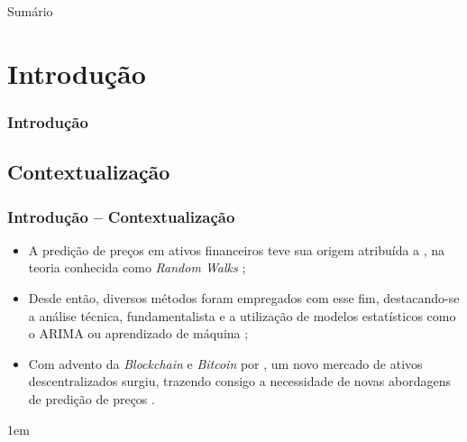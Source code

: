 \documentclass[aspectratio=169]{beamer}
\begin{document}
\begin{frame}
  \titlepage
\end{frame}


\begin{frame}[fragile]{Sumário}
  \tableofcontents
\end{frame}


\section{Introdução}

\begin{frame} \frametitle{Introdução}
	\begin{center}
	\end{center}
\end{frame}


\subsection{Contextualização}

\begin{frame}[fragile] \frametitle{Introdução -- Contextualização}
	\begin{itemize} \itemsep1em
	\item 	A predição de preços em ativos financeiros teve sua origem atribuída a \textcite{Bachelier}, na teoria conhecida como \textit{Random Walks} \cite{Fama1965,Fama,Courtault};
		
	\item 	Desde então, diversos métodos foram empregados com esse fim, destacando-se a análise técnica, fundamentalista e a utilização de modelos estatísticos como o ARIMA \cite{Ariyo} ou aprendizado de máquina \cite{Fer};
		
	\item 	Com advento da \textit{Blockchain} e \textit{Bitcoin} por \cite{Nakamoto}, um novo mercado de ativos descentralizados surgiu, trazendo consigo a necessidade de novas abordagens de predição de preços \cite{Zhang}.
	\end{itemize} \itemsep1em
\end{frame}
\end{document}
